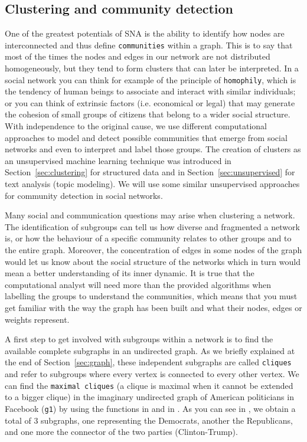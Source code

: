 
\subsection{Clustering and community detection}

One of the greatest potentials of SNA is the ability to identify how nodes are interconnected and thus define \texttt{communities} within a graph. This is to say that most of the times the nodes and edges in our network are not distributed homogeneously, but they tend to form clusters that can  later be interpreted. In a social network you can think for example of the principle of \texttt{homophily}, which is the tendency of human beings to associate and interact with similar individuals; or you can think of extrinsic factors (i.e. economical or legal) that may generate the cohesion of small groups of citizens that belong to a wider social structure. With independence to the original cause, we use different computational approaches to model and detect possible communities that emerge from social networks and even to interpret and label those groups. The creation of clusters as an unsupervised machine learning technique was introduced in Section~\ref{sec:clustering} for structured data and in Section~\ref{sec:unsupervised} for text analysis (topic modeling). We will use some similar unsupervised approaches for community detection in social networks.

Many social and communication questions may arise when clustering a network. The identification of subgroups can tell us how diverse and fragmented a network is, or how the behaviour of a specific community relates to other groups and to the entire graph. Moreover, the concentration of edges in some nodes of the graph would let us know about the social structure of the networks which in turn would mean a better understanding of its inner dynamic.  It is true that the computational analyst will need more than the provided algorithms when labelling the groups to understand the communities, which means that you must get familiar with the way the graph has been built and what their nodes, edges or weights represent.

A first step to get involved with subgroups within a network is to find the available complete subgraphs in an undirected graph. As we briefly explained at the end of Section~\ref{sec:graph}, these independent subgraphs are called \texttt{cliques} and refer to subgroups where every vertex is connected to every other vertex. We can find the \texttt{maximal cliques} (a clique is maximal when it cannot be extended to a  bigger clique) in the imaginary undirected graph of American politicians in Facebook (\texttt{g1}) by using the functions  in  \citep{eppstein2010listing} and  in  \citep{cazals2008note}. As you can see in , we obtain a total of 3 subgraphs, one representing the Democrats, another the Republicans, and one more the connector of the two parties (Clinton-Trump).

